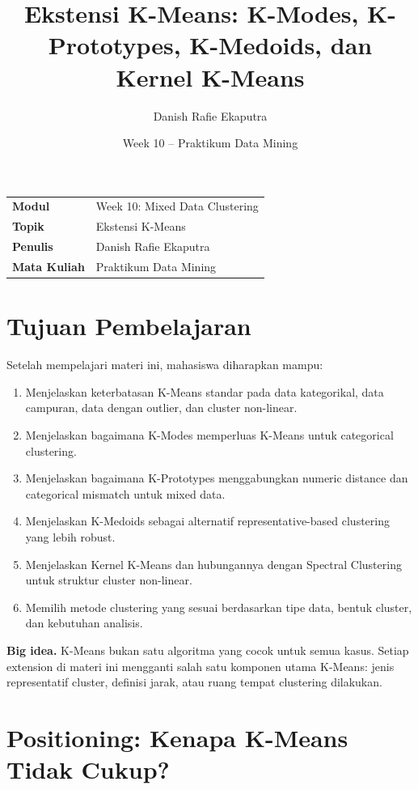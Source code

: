 \documentclass{article}
\title{Ekstensi K-Means: K-Modes, K-Prototypes, K-Medoids, dan Kernel K-Means}
\author{Danish Rafie Ekaputra}
\date{Week 10 -- Praktikum Data Mining}
\newcommand{\theauthor}{Danish Rafie Ekaputra}
\newcommand{\infobox}[2]{%
  \par\vspace{0.6em}
  \noindent\colorbox{#1}{%
    \begin{minipage}{0.96\textwidth}
    \vspace{0.65em}
    #2
    \vspace{0.65em}
    \end{minipage}}
  \par\vspace{0.8em}
}
\begin{document}
\maketitle

\noindent\begin{tabular}{@{}>{\bfseries}ll}
    Modul & Week 10: Mixed Data Clustering\\
    Topik & Ekstensi K-Means\\
    Penulis & \theauthor\\
    Mata Kuliah & Praktikum Data Mining
\end{tabular}

\section*{Tujuan Pembelajaran}

Setelah mempelajari materi ini, mahasiswa diharapkan mampu:

\begin{enumerate}[leftmargin=*]
    \item Menjelaskan keterbatasan K-Means standar pada data kategorikal, data campuran, data dengan outlier, dan cluster non-linear.
    \item Menjelaskan bagaimana K-Modes memperluas K-Means untuk categorical clustering.
    \item Menjelaskan bagaimana K-Prototypes menggabungkan numeric distance dan categorical mismatch untuk mixed data.
    \item Menjelaskan K-Medoids sebagai alternatif representative-based clustering yang lebih robust.
    \item Menjelaskan Kernel K-Means dan hubungannya dengan Spectral Clustering untuk struktur cluster non-linear.
    \item Memilih metode clustering yang sesuai berdasarkan tipe data, bentuk cluster, dan kebutuhan analisis.
\end{enumerate}

\infobox{softBlue}{\textbf{Big idea.} K-Means bukan satu algoritma yang cocok untuk semua kasus. Setiap extension di materi ini mengganti salah satu komponen utama K-Means: jenis representatif cluster, definisi jarak, atau ruang tempat clustering dilakukan.}

\section{Positioning: Kenapa K-Means Tidak Cukup?}
\end{document}
